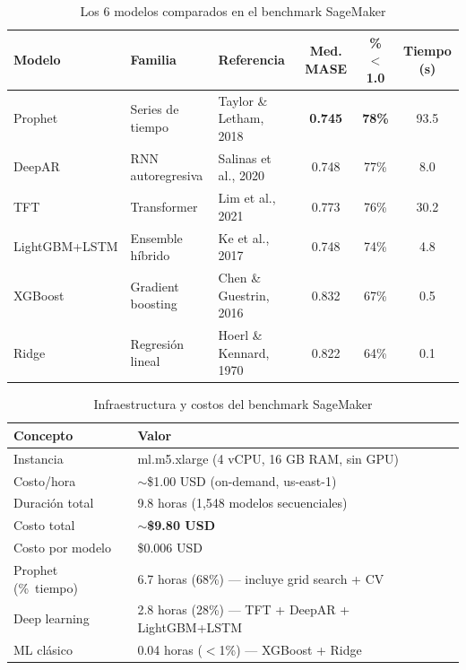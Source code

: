 \documentclass[12pt, letterpaper]{article}
\begin{document}
\begin{table}[H]
\centering
\caption{Los 6 modelos comparados en el benchmark SageMaker}
\label{tab:modelos}
\small
\begin{tabularx}{\textwidth}{l l l c c c}
\toprule
\textbf{Modelo} & \textbf{Familia} & \textbf{Referencia} & \textbf{Med. MASE} & \textbf{\%$<$1.0} & \textbf{Tiempo (s)} \\
\midrule
\rowcolor{lightgreen!30}
Prophet         & Series de tiempo   & Taylor \& Letham, 2018   & \textbf{0.745} & \textbf{78\%} & 93.5 \\
DeepAR          & RNN autoregresiva  & Salinas et al., 2020     & 0.748          & 77\%           & 8.0 \\
TFT             & Transformer        & Lim et al., 2021         & 0.773          & 76\%           & 30.2 \\
LightGBM+LSTM   & Ensemble híbrido   & Ke et al., 2017          & 0.748          & 74\%           & 4.8 \\
XGBoost         & Gradient boosting  & Chen \& Guestrin, 2016   & 0.832          & 67\%           & 0.5 \\
Ridge           & Regresión lineal   & Hoerl \& Kennard, 1970   & 0.822          & 64\%           & 0.1 \\
\bottomrule
\end{tabularx}
\end{table}

\begin{table}[H]
\centering
\caption{Infraestructura y costos del benchmark SageMaker}
\label{tab:infra}
\begin{tabular}{ll}
\toprule
\textbf{Concepto} & \textbf{Valor} \\
\midrule
Instancia          & ml.m5.xlarge (4 vCPU, 16 GB RAM, sin GPU) \\
Costo/hora         & $\sim$\$1.00 USD (on-demand, us-east-1) \\
Duración total     & 9.8 horas (1,548 modelos secuenciales) \\
Costo total        & \textbf{$\sim$\$9.80 USD} \\
Costo por modelo   & \$0.006 USD \\
Prophet (\%~tiempo) & 6.7 horas (68\%) — incluye grid search + CV \\
Deep learning      & 2.8 horas (28\%) — TFT + DeepAR + LightGBM+LSTM \\
ML clásico         & 0.04 horas ($<$1\%) — XGBoost + Ridge \\
\bottomrule
\end{tabular}
\end{table}
\end{document}
